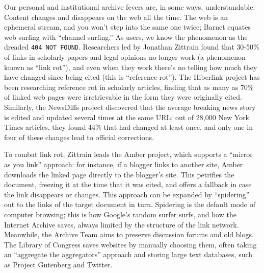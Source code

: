 Our personal and institutional archive fevers are, in some ways, understandable. Content changes and disappears on the web all the time. The web is an ephemeral stream, and you won't step into the same one twice; Barnet equates web surfing with ``channel surfing.''\autocite[217]{barnet_pack-rat_2001} As users, we know the phenomenon as the dreaded \texttt{404 NOT FOUND}. Researchers led by Jonathan Zittrain found that 30-50\% of links in scholarly papers and legal opinions no longer work (a phenomenon known as ``link rot''), and even when they work there's no telling how much they have changed since being cited (this is ``reference rot'').\autocite{zittrain_perma:_2013} The Hiberlink project has been researching reference rot in scholarly articles, finding that as many as 70\% of linked web pages were irretrievable in the form they were originally cited.\autocite{_one_2015} Similarly, the NewsDiffs project discovered that the average breaking news story is edited and updated several times at the same URL; out of 28,000 New York Times articles, they found 44\% that had changed at least once, and only one in four of these changes lead to official corrections.\autocite{lee_version_2013}

To combat link rot, Zittrain leads the Amber project, which supports a ``mirror as you link'' approach: for instance, if a blogger links to another site, Amber downloads the linked page directly to the blogger's site.\autocite[See http://amberlink.org; see also][]{zittrain_fourth_2010} This petrifies the document, freezing it at the time that it was cited, and offers a fallback in case the link disappears or changes. This approach can be expanded by ``spidering'' out to the links of the target document in turn. Spidering is the default mode of computer browsing; this is how Google's random surfer surfs, and how the Internet Archive saves, always limited by the structure of the link network. Meanwhile, the Archive Team aims to preserve discussion forums and old blogs. The Library of Congress saves websites by manually choosing them, often taking an ``aggregate the aggregators'' approach and storing large text databases, such as Project Gutenberg and Twitter.


